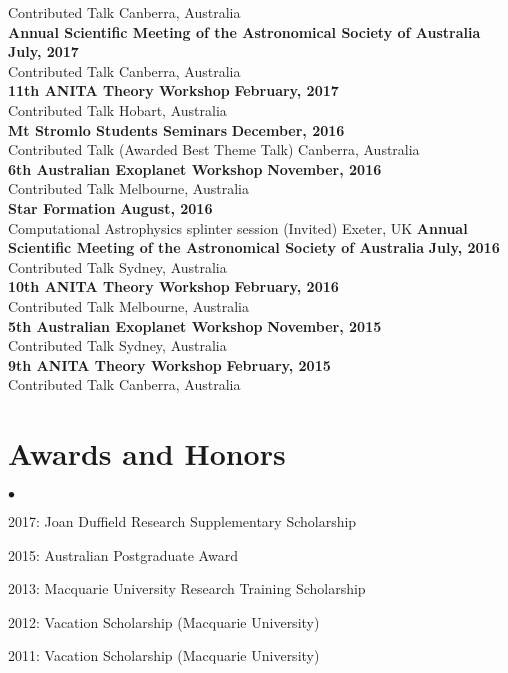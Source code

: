 \documentclass[margin,line]{res}
\newenvironment{list2}{
	\begin{list}{$\bullet$}{%
			\setlength{\itemsep}{0in}
			\setlength{\parsep}{0in} \setlength{\parskip}{0in}
			\setlength{\topsep}{0in} \setlength{\partopsep}{0in} 
			\setlength{\leftmargin}{0.2in}}}{\end{list}}
\begin{document}
\begin{resume}
		Contributed Talk \hfill Canberra, Australia\\
		{\bf Annual Scientific Meeting of the Astronomical Society of Australia} \hfill {\bf July, 2017}\\
		Contributed Talk \hfill Canberra, Australia\\
		{\bf 11th ANITA Theory Workshop} \hfill {\bf February, 2017}\\
		Contributed Talk \hfill Hobart, Australia\\
		{\bf Mt Stromlo Students Seminars} \hfill {\bf December, 2016}\\
		Contributed Talk (Awarded Best Theme Talk) \hfill Canberra, Australia\\
		{\bf 6th Australian Exoplanet Workshop} \hfill {\bf November, 2016}\\
		Contributed Talk \hfill Melbourne, Australia\\
		{\bf Star Formation} \hfill {\bf August, 2016}\\
		Computational Astrophysics splinter session (Invited) \hfill Exeter, UK
		{\bf Annual Scientific Meeting of the Astronomical Society of Australia} \hfill {\bf July, 2016}\\
		Contributed Talk \hfill Sydney, Australia\\
		{\bf 10th ANITA Theory Workshop} \hfill {\bf February, 2016}\\
		Contributed Talk \hfill Melbourne, Australia\\
		{\bf 5th Australian Exoplanet Workshop} \hfill {\bf November, 2015}\\
		Contributed Talk \hfill Sydney, Australia\\
		{\bf 9th ANITA Theory Workshop} \hfill {\bf February, 2015}\\
		Contributed Talk \hfill Canberra, Australia\\
		
		\section{\sc Awards and Honors}
		\begin{list2}
			\item 2017: Joan Duffield Research Supplementary Scholarship
			\item 2015: Australian Postgraduate Award
			\item 2013: Macquarie University Research Training Scholarship
			\item 2012: Vacation Scholarship (Macquarie University)
			\item 2011: Vacation Scholarship (Macquarie University)
		\end{list2}
		

\end{resume}
\end{document}
